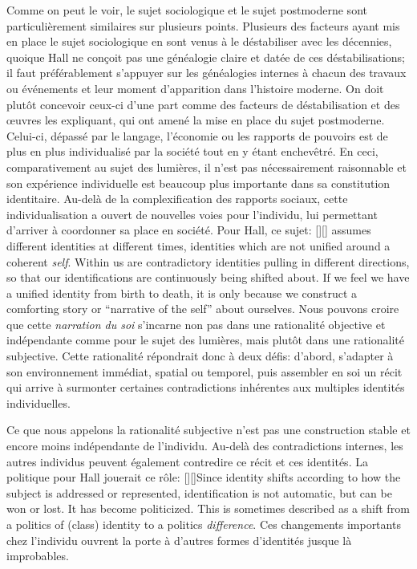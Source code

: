 Comme on peut le voir, le sujet sociologique et le sujet postmoderne sont particulièrement similaires sur plusieurs points.
Plusieurs des facteurs ayant mis en place le sujet sociologique en sont venus à le déstabiliser avec les décennies, quoique Hall ne conçoit pas une généalogie claire et datée de ces déstabilisations; il faut préférablement s'appuyer sur les généalogies internes à chacun des travaux ou événements et leur moment d'apparition dans l'histoire moderne.
On doit plutôt concevoir ceux-ci d'une part comme des facteurs de déstabilisation et des œuvres les expliquant, qui ont amené la mise en place du sujet postmoderne.
Celui-ci, dépassé par le langage, l'économie ou les rapports de pouvoirs est de plus en plus individualisé par la société tout en y étant enchevêtré.
En ceci, comparativement au sujet des lumières, il n'est pas nécessairement raisonnable et son expérience individuelle est beaucoup plus importante dans sa constitution identitaire.
Au-delà de la complexification des rapports sociaux, cette individualisation a ouvert de nouvelles voies pour l'individu, lui permettant d'arriver à coordonner sa place en société.
Pour Hall, ce sujet: [{\citeyear[598]{Hall1996a}}][]{\textelp{} assumes different identities at different times, identities which are not unified around a coherent \emph{self}. Within us are contradictory identities pulling in different directions, so that our identifications are continuously being shifted about. If we feel we have a unified identity from birth to death, it is only because we construct a comforting story or \enquote{narrative of the self} about ourselves}.
Nous pouvons croire que cette \emph{narration du soi} s'incarne non pas dans une rationalité objective et indépendante comme pour le sujet des lumières, mais plutôt dans une rationalité subjective.
Cette rationalité répondrait donc à deux défis: d'abord, s'adapter à son environnement immédiat, spatial ou temporel, puis assembler en soi un récit qui arrive à surmonter certaines contradictions inhérentes aux multiples identités individuelles.

Ce que nous appelons la rationalité subjective n'est pas une construction stable et encore moins indépendante de l'individu.
Au-delà des contradictions internes, les autres individus peuvent également contredire ce récit et ces identités.
La politique pour Hall jouerait ce rôle: [{\citeyear[610]{Hall1996a}}][]{Since identity shifts according to how the subject is addressed or represented, identification is not automatic, but can be won or lost. It has become politicized. This is sometimes described as a shift from a politics of (class) identity to a politics \emph{difference}}.
Ces changements importants chez l'individu ouvrent la porte à d'autres formes d'identités jusque là improbables.

